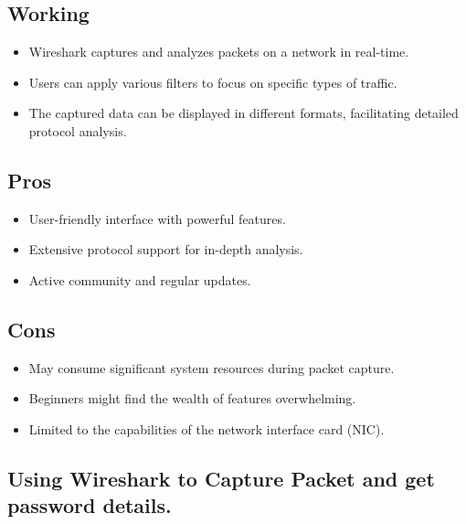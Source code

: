 \documentclass[11pt]{article}
\begin{document}
\subsection{Working}
\begin{itemize}
	\item Wireshark captures and analyzes packets on a network in real-time.
	\item Users can apply various filters to focus on specific types of traffic.
	\item The captured data can be displayed in different formats, facilitating detailed
	      protocol analysis.
\end{itemize}

\subsection{Pros}
\begin{itemize}
	\item User-friendly interface with powerful features.
	\item Extensive protocol support for in-depth analysis.
	\item Active community and regular updates.
\end{itemize}

\subsection{Cons}
\begin{itemize}
	\item May consume significant system resources during packet capture.
	\item Beginners might find the wealth of features overwhelming.
	\item Limited to the capabilities of the network interface card (NIC).
\end{itemize}

\subsection{Using Wireshark to Capture Packet and get password details. }
\end{document}
